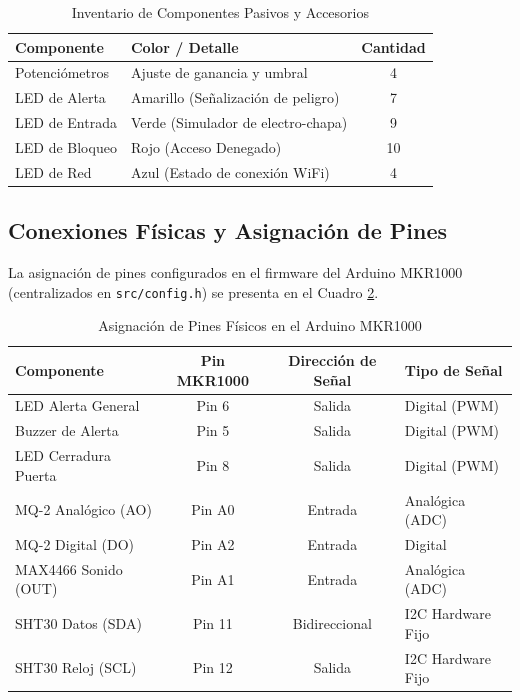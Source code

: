 \documentclass[12pt,letterpaper]{article}
\begin{document}
\begin{table}[H]
    \centering
    \caption{Inventario de Componentes Pasivos y Accesorios}
    \label{tab:inventario_componentes}
    \begin{tabular}{llc}
        \toprule
        \textbf{Componente} & \textbf{Color / Detalle} & \textbf{Cantidad} \\
        \midrule
        Potenciómetros & Ajuste de ganancia y umbral & 4 \\
        LED de Alerta & Amarillo (Señalización de peligro) & 7 \\
        LED de Entrada & Verde (Simulador de electro-chapa) & 9 \\
        LED de Bloqueo & Rojo (Acceso Denegado) & 10 \\
        LED de Red & Azul (Estado de conexión WiFi) & 4 \\
        \bottomrule
    \end{tabular}
\end{table}

\subsection{Conexiones Físicas y Asignación de Pines}
La asignación de pines configurados en el firmware del Arduino MKR1000 (centralizados en \texttt{src/config.h}) se presenta en el Cuadro \ref{tab:pines_mkr}.

\begin{table}[H]
    \centering
    \caption{Asignación de Pines Físicos en el Arduino MKR1000}
    \label{tab:pines_mkr}
    \begin{tabular}{lccl}
        \toprule
        \textbf{Componente} & \textbf{Pin MKR1000} & \textbf{Dirección de Señal} & \textbf{Tipo de Señal} \\
        \midrule
        LED Alerta General & Pin 6 & Salida & Digital (PWM) \\
        Buzzer de Alerta & Pin 5 & Salida & Digital (PWM) \\
        LED Cerradura Puerta & Pin 8 & Salida & Digital (PWM) \\
        \midrule
        MQ-2 Analógico (AO) & Pin A0 & Entrada & Analógica (ADC) \\
        MQ-2 Digital (DO) & Pin A2 & Entrada & Digital \\
        MAX4466 Sonido (OUT) & Pin A1 & Entrada & Analógica (ADC) \\
        \midrule
        SHT30 Datos (SDA) & Pin 11 & Bidireccional & I2C Hardware Fijo \\
        SHT30 Reloj (SCL) & Pin 12 & Salida & I2C Hardware Fijo \\
        \bottomrule
    \end{tabular}
\end{table}
\end{document}
